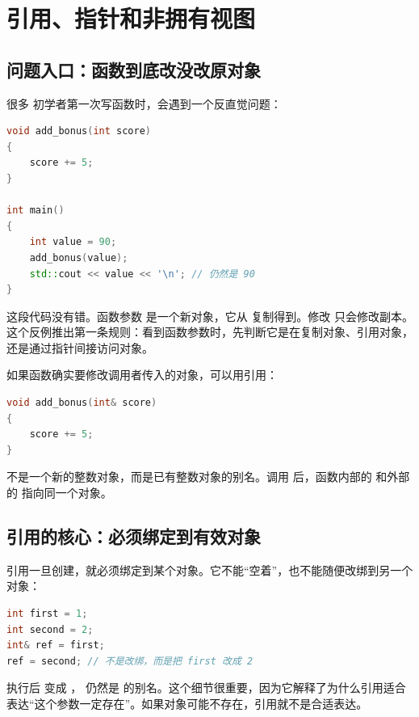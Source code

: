 \chapter{引用、指针和非拥有视图}

\section{问题入口：函数到底改没改原对象}

很多 \cpp 初学者第一次写函数时，会遇到一个反直觉问题：

\begin{lstlisting}[language=C++,caption={按值传参不会修改原对象}]
void add_bonus(int score)
{
    score += 5;
}

int main()
{
    int value = 90;
    add_bonus(value);
    std::cout << value << '\n'; // 仍然是 90
}
\end{lstlisting}

这段代码没有错。函数参数  是一个新对象，它从  复制得到。修改  只会修改副本。这个反例推出第一条规则：看到函数参数时，先判断它是在复制对象、引用对象，还是通过指针间接访问对象。

如果函数确实要修改调用者传入的对象，可以用引用：

\begin{lstlisting}[language=C++,caption={非 const 引用表达可修改}]
void add_bonus(int& score)
{
    score += 5;
}
\end{lstlisting}

 不是一个新的整数对象，而是已有整数对象的别名。调用  后，函数内部的  和外部的  指向同一个对象。

\section{引用的核心：必须绑定到有效对象}

引用一旦创建，就必须绑定到某个对象。它不能“空着”，也不能随便改绑到另一个对象：

\begin{lstlisting}[language=C++,caption={引用绑定后就是别名}]
int first = 1;
int second = 2;
int& ref = first;
ref = second; // 不是改绑，而是把 first 改成 2
\end{lstlisting}

执行后  变成 ， 仍然是  的别名。这个细节很重要，因为它解释了为什么引用适合表达“这个参数一定存在”。如果对象可能不存在，引用就不是合适表达。

